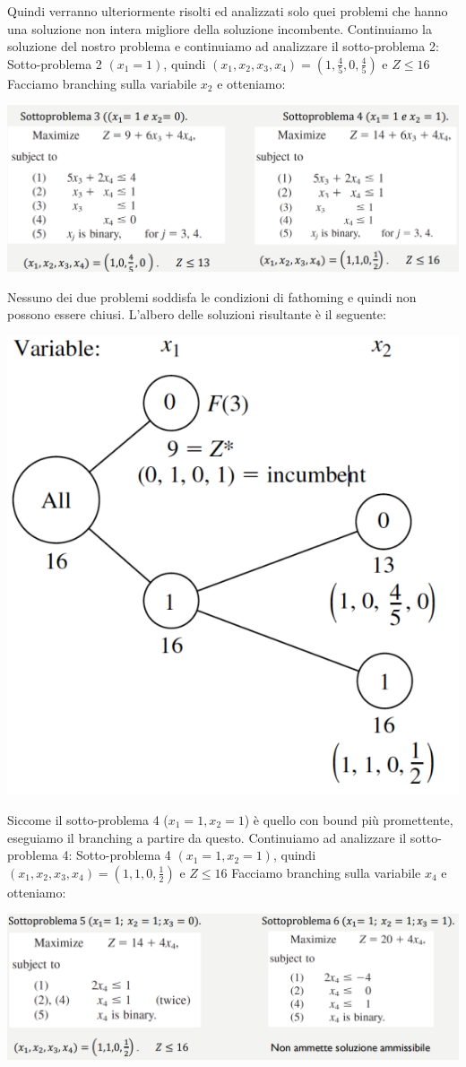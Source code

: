 \documentclass[12pt]{article}
\begin{document}
Quindi verranno ulteriormente risolti ed analizzati solo quei problemi che hanno una soluzione non intera migliore della soluzione incombente.
Continuiamo la soluzione del nostro problema e continuiamo ad analizzare il sotto-problema 2: \newline
Sotto-problema 2 $(x_1 = 1)$, quindi $(x_1, x_2, x_3, x_4) = (1, \frac{4}{5}, 0, \frac{4}{5})$ e $Z \leq 16$ \newline
Facciamo branching sulla variabile $x_2$ e otteniamo:
\begin{center}
    \includegraphics[width = 0.90\linewidth]{Images/67.png}
\end{center}
Nessuno dei due problemi soddisfa le condizioni di fathoming e quindi non possono essere chiusi.
L'albero delle soluzioni risultante è il seguente:
\begin{center}
    \includegraphics[width = 0.55\linewidth]{Images/68.png}
\end{center}
Siccome il sotto-problema 4 ($x_1 = 1, x_2 = 1$) è quello con bound più promettente, eseguiamo il branching a
partire da questo.
Continuiamo ad analizzare il sotto-problema 4: \newline
Sotto-problema 4 $(x_1 = 1, x_2 = 1)$, quindi $(x_1, x_2, x_3, x_4) = (1, 1, 0, \frac{1}{2})$ e $Z \leq 16$ \newline
Facciamo branching sulla variabile $x_4$ e otteniamo:
\begin{center}
    \includegraphics[width = 1\linewidth]{Images/69.png}
\end{center}
\end{document}
